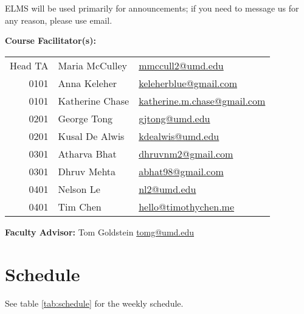 \documentclass[12pt]{article}
\begin{document}
ELMS will be used primarily for announcements; if you need to message us for any reason,
please use email.

\medskip

\noindent\textbf{Course Facilitator(s): }

\begin{table}[H]
  \begin{tabular}{@{}rll}
    Head TA & Maria McCulley  & \href{mailto:mmccull2@umd.edu}{mmccull2@umd.edu}\\
    0101    & Anna Keleher    & \href{mailto:keleherblue@gmail.com}{keleherblue@gmail.com}\\
    0101    & Katherine Chase & \href{mailto:katherine.m.chase@gmail.com}
                                {katherine.m.chase@gmail.com}\\
    0201    & George Tong     & \href{mailto:gjtong@umd.edu}{gjtong@umd.edu}\\
    0201    & Kusal De Alwis  & \href{mailto:kdealwis@umd.edu}{kdealwis@umd.edu}\\
    0301    & Atharva Bhat    & \href{mailto:dhruvnm2@gmail.com}{dhruvnm2@gmail.com}\\
    0301    & Dhruv Mehta     & \href{mailto:abhat98@gmail.com}{abhat98@gmail.com}\\
    0401    & Nelson Le       & \href{mailto:nle@umd.edu}{nl2@umd.edu}\\
    0401    & Tim Chen        & \href{mailto:hello@timothychen.me}{hello@timothychen.me}
  \end{tabular}
\end{table}
\medskip

\noindent\textbf{Faculty Advisor: }Tom Goldstein
\href{mailto:tomg@umd.edu}{tomg@umd.edu} \medskip

\bigskip


\section*{Schedule}
See table \ref{tab:schedule} for the weekly schedule.
\end{document}
